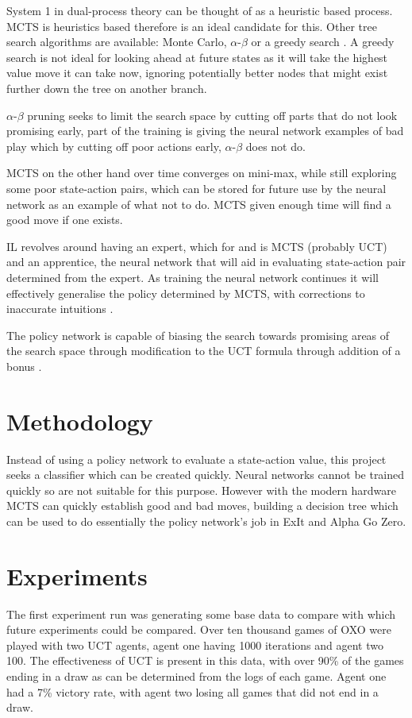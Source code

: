 \documentclass[conference]{IEEEtran}
\begin{document}
System 1 in dual-process theory can be thought of as a heuristic based process. MCTS is heuristics based therefore is an ideal candidate for this. Other tree search algorithms are available: Monte Carlo, $\alpha$-$\beta$ or a greedy search \cite{ExpertIteration}. A greedy search is not ideal for looking ahead at future states as it will take the highest value move it can take now, ignoring potentially better nodes that might exist further down the tree on another branch.

$\alpha$-$\beta$ pruning seeks to limit the search space by cutting off parts that do not look promising early, part of the training is giving the neural network examples of bad play which by cutting off poor actions early, $\alpha$-$\beta$ does not do.

MCTS on the other hand over time converges on mini-max, while still exploring some poor state-action pairs, which can be stored for future use by the neural network as an example of what not to do. MCTS given enough time will find a good move if one exists. 

IL revolves around having an expert, which for \cite{ExpertIteration} and \cite{go} is MCTS (probably UCT) and an apprentice, the neural network that will aid in evaluating state-action pair determined from the expert. As training the neural network continues it will effectively generalise the policy determined by MCTS, with corrections to inaccurate intuitions \cite{ExpertIteration}.

The policy network is capable of biasing the search towards promising areas of the search space through modification to the UCT formula through addition of a bonus \cite{ExpertIteration}. 
   
\section{Methodology}
Instead of using a policy network to evaluate a state-action value, this project seeks a classifier which can be created quickly. Neural networks cannot be trained quickly so are not suitable for this purpose. However with the modern hardware MCTS can quickly establish good and bad moves, building a decision tree which can be used to do essentially the policy network's job in ExIt and Alpha Go Zero. 

\section{Experiments}
The first experiment run was generating some base data to compare with which future experiments could be compared. Over ten thousand games of OXO were played with two UCT agents, agent one having 1000 iterations and agent two 100. The effectiveness of UCT is present in this data, with over 90\% of the games ending in a draw as can be determined from the logs of each game. Agent one had a 7\% victory rate, with agent two losing all games that did not end in a draw. 
\end{document}
